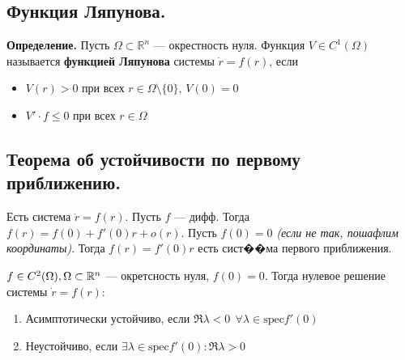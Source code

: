\subsection*{Функция Ляпунова.}

\noindent \textbf{Определение.} Пусть $\Omega \subset \mathbb{R}^n$ --- окрестность нуля. Функция $V \in C^1(\Omega)$ называется \textbf{функцией Ляпунова} системы $\dot{r} = f(r)$, если
\begin{itemize}
    \item $V(r) > 0$ при всех $r \in \Omega \setminus \{0\}$, $V(0) = 0$
    \item $V' \cdot f \le 0$ при всех $r \in \Omega$
\end{itemize}

\subsection*{Теорема об устойчивости по первому приближению.}

Есть система \(\dot{r} = f(r)\). Пусть \(f\) --- дифф. Тогда \(f(r) = f(0) + f'(0)r + o(r)\). Пусть \(f(0) = 0\) \textit{(если не так, пошафлим координаты)}. Тогда \(f(r) = f'(0)r\) есть сист��ма первого приближения.

\begin{theorem}
    \(f\in C^2(\Omega), \Omega\subset \mathbb{R}^n\) --- окретсность нуля, \(f(0) = 0\). Тогда нулевое решение системы \(\dot{r} = f(r)\):
    \begin{enumerate}
        \item Асимптотически устойчиво, если \(\Re \lambda < 0 \ \ \forall \lambda \in \text{spec} f'(0)\)
        \item Неустойчиво, если \(\exists \lambda\in \text{spec} f'(0) : \Re \lambda > 0\)
    \end{enumerate}
\end{theorem}



 